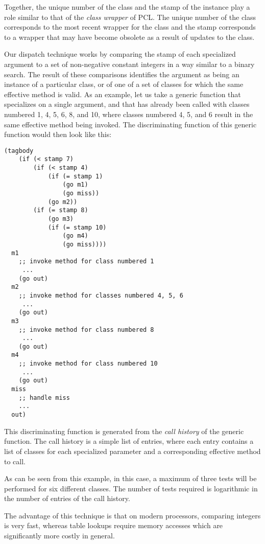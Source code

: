 Together, the unique number of the class and the stamp of the instance
play a role similar to that of the \emph{class wrapper} of PCL.  The
unique number of the class corresponds to the most recent wrapper for
the class and the stamp corresponds to a wrapper that may have become
obsolete as a result of updates to the class.  

Our dispatch technique works by comparing the stamp of each
specialized argument to a set of non-negative constant integers in a
way similar to a binary search.  The result of these comparisons
identifies the argument as being an instance of a particular class, or
of one of a set of classes for which the same effective method is
valid.  As an example, let us take a generic function that specializes
on a single argument, and that has already been called with classes
numbered 1, 4, 5, 6, 8, and 10, where classes numbered 4, 5, and 6
result in the same effective method being invoked.  The discriminating
function of this generic function would then look like this:

\begin{verbatim}
(tagbody 
    (if (< stamp 7)
        (if (< stamp 4)
            (if (= stamp 1)
                (go m1)
                (go miss))
            (go m2))
        (if (= stamp 8)
            (go m3)
            (if (= stamp 10)
                (go m4)
                (go miss))))
  m1
    ;; invoke method for class numbered 1
     ...
    (go out)
  m2
    ;; invoke method for classes numbered 4, 5, 6
     ...
    (go out)
  m3
    ;; invoke method for class numbered 8
     ...
    (go out)   
  m4
    ;; invoke method for class numbered 10
     ...
    (go out)   
  miss
    ;; handle miss
    ...
  out)
\end{verbatim}

This discriminating function is generated from the \emph{call history}
of the generic function.  The call history is a simple list of
entries, where each entry contains a list of classes for each
specialized parameter and a corresponding effective method to call. 

As can be seen from this example, in this case, a maximum of
three tests will be performed for six different classes.  The number
of tests required is logarithmic in the number of entries of the call
history.

The advantage of this technique is that on modern processors,
comparing integers is very fast, whereas table lookups require memory
accesses which are significantly more costly in general.

